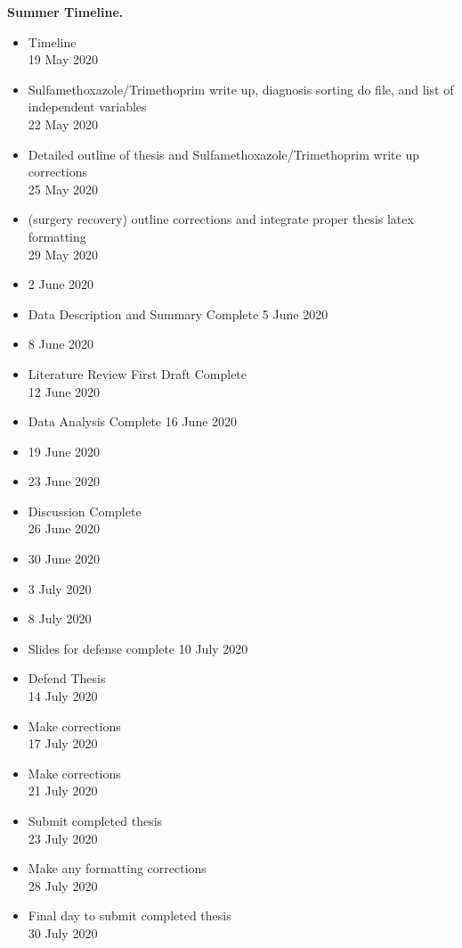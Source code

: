 \noindent \textbf{Summer Timeline.}
\begin{itemize}
    \item Timeline\\
    19 May 2020
    
    \item Sulfamethoxazole/Trimethoprim write up, diagnosis sorting do file, and list of independent variables\\
    22 May 2020
    
    \item Detailed outline of thesis and Sulfamethoxazole/Trimethoprim write up corrections\\
    25 May 2020

    \item (surgery recovery) outline corrections and integrate proper thesis latex formatting\\
    29 May 2020

    \item
    2 June 2020

    \item Data Description and Summary Complete
    5 June 2020

    \item
    8 June 2020

    \item Literature Review First Draft Complete\\
    12 June 2020

    \item Data Analysis Complete
    16 June 2020
    
    \item
    19 June 2020

    \item
    23 June 2020

    \item Discussion Complete\\
    26 June 2020

    \item 30 June 2020

    \item 3 July 2020

    \item 8 July 2020
    
    \item Slides for defense complete
    10 July 2020

    \item Defend Thesis\\
    14 July 2020

    \item Make corrections\\
    17 July 2020

    \item Make corrections\\
    21 July 2020

    \item Submit completed thesis\\
    23 July 2020

    \item Make any formatting corrections\\
    28 July 2020

    \item Final day to submit completed thesis\\
    30 July 2020
\end{itemize}


